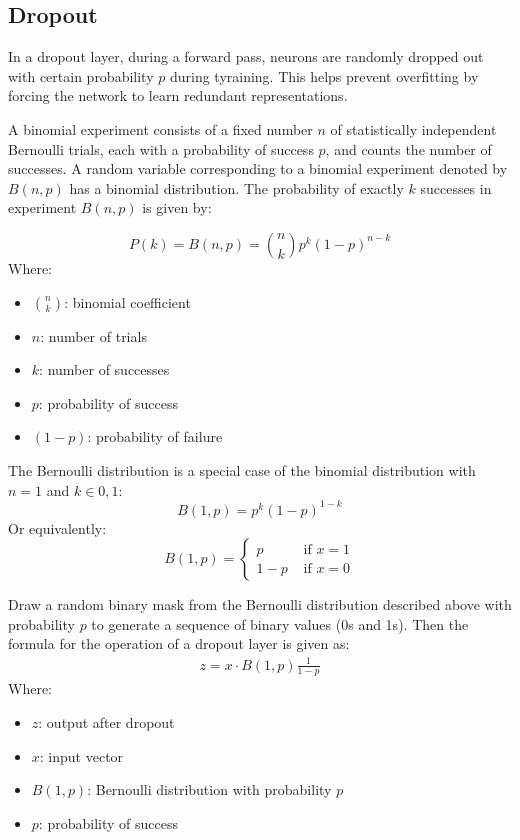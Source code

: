 \documentclass[a4paper]{report}
\begin{document}
\subsection{Dropout}
In a dropout layer, during a forward pass, neurons are randomly dropped out with certain probability $p$ during tyraining. This helps prevent overfitting by forcing the network to learn redundant representations.

A binomial experiment consists of a fixed number $n$ of statistically independent Bernoulli trials, each with a probability of success $p$, and counts the number of successes. A random variable corresponding to a binomial experiment denoted by $B(n,p)$ has a binomial distribution. The probability of exactly $k$ successes in experiment $B(n,p)$ is given by:

\begin{equation*}
    P(k) = B(n,p) = \binom{n}{k} p^k (1-p)^{n-k}
\end{equation*}
Where:
\begin{itemize}
    \item $\binom{n}{k}$: binomial coefficient
    \item $n$: number of trials
    \item $k$: number of successes
    \item $p$: probability of success
    \item $(1-p)$: probability of failure
\end{itemize}

The Bernoulli distribution is a special case of the binomial distribution with $n=1$ and $k \in {0,1}$:
\begin{equation*}
    B(1,p) = p^k (1-p)^{1-k}
\end{equation*}
Or equivalently:
\begin{equation*}
    B(1,p) = \begin{cases}
        p   & \text{ if } x=1\\
        1-p & \text{ if } x=0
    \end{cases}
\end{equation*}

Draw a random binary mask from the Bernoulli distribution described above with probability $p$ to generate a sequence of binary values (0s and 1s). Then the formula for the operation of a dropout layer is given as:
\begin{align*}
    z = x \cdot B(1,p) \frac{1}{1-p}
\end{align*}
Where:
\begin{itemize}
    \item $z$: output after dropout
    \item $x$: input vector
    \item $B(1,p)$: Bernoulli distribution with probability $p$
    \item $p$: probability of success
\end{itemize}
\end{document}
